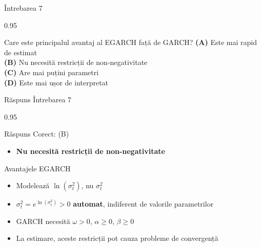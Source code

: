 \documentclass[9pt, aspectratio=169, t]{beamer}
\begin{document}
\begin{frame}{Întrebarea 7}
    \begin{cminipage}{0.95\textwidth}
    \begin{block}{Care este principalul avantaj al EGARCH față de GARCH?}
        \textcolor{MainBlue}{\textbf{(A)}} Este mai rapid de estimat\\[3pt]
        \textcolor{MainBlue}{\textbf{(B)}} Nu necesită restricții de non-negativitate\\[3pt]
        \textcolor{MainBlue}{\textbf{(C)}} Are mai puțini parametri\\[3pt]
        \textcolor{MainBlue}{\textbf{(D)}} Este mai ușor de interpretat
    \end{block}
    \end{cminipage}
\end{frame}

\begin{frame}{Răspuns Întrebarea 7}
    \begin{cminipage}{0.95\textwidth}
    \begin{exampleblock}{Răspuns Corect: (B)}
        \begin{itemize}\setlength{\itemsep}{0pt}
            \item \textbf{Nu necesită restricții de non-negativitate}
        \end{itemize}
    \end{exampleblock}

    \pause
    \begin{block}{Avantajele EGARCH}
        \begin{itemize}\setlength{\itemsep}{0pt}
            \item Modelează $\ln(\sigma_t^2)$, nu $\sigma_t^2$
            \item $\sigma_t^2 = e^{\ln(\sigma_t^2)} > 0$ \textbf{automat}, indiferent de valorile parametrilor
            \item GARCH necesită $\omega > 0$, $\alpha \geq 0$, $\beta \geq 0$
            \item La estimare, aceste restricții pot cauza probleme de convergență
        \end{itemize}
    \end{block}
    \end{cminipage}
\end{frame}
\end{document}
